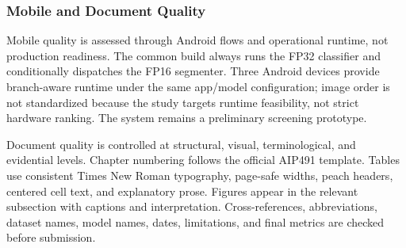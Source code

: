 \documentclass[12pt,a4paper]{report}
\newenvironment{revisionblock}{\begin{snugshade}\noindent}{\end{snugshade}}
\begin{document}
\subsubsection{Mobile and Document Quality}
\begin{revisionblock}
Mobile quality is assessed through Android flows and operational runtime, not production readiness. The common build always runs the FP32 classifier and conditionally dispatches the FP16 segmenter. Three Android devices provide branch-aware runtime under the same app/model configuration; image order is not standardized because the study targets runtime feasibility, not strict hardware ranking. The system remains a preliminary screening prototype.
\end{revisionblock}
Document quality is controlled at structural, visual, terminological, and evidential levels. Chapter numbering follows the official AIP491 template. Tables use consistent Times New Roman typography, page-safe widths, peach headers, centered cell text, and explanatory prose. Figures appear in the relevant subsection with captions and interpretation. Cross-references, abbreviations, dataset names, model names, dates, limitations, and final metrics are checked before submission.\par
\end{document}
